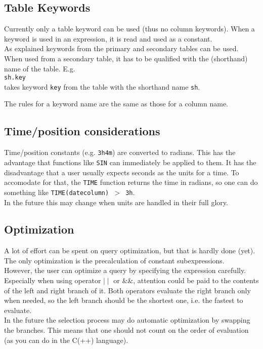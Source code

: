 \label{TAQL:KEYWORDS}
\subsection{Table Keywords}
Currently only a table keyword can be used (thus no column keywords).
When a keyword is used in an expression, it is read and used as
a constant.
\\
As explained 
keywords from the primary and secondary tables can be used. When used
from a secondary table, it has to be qualified with the (shorthand) name
of the table. E.g.
\\\texttt{sh.key}
\\takes keyword \texttt{key} from the table with the shorthand name
\texttt{sh}.

The rules for a keyword name are the same as those for a column name.

\subsection{Time/position considerations}
Time/position constants (e.g. \texttt{3h4m}) are converted to
radians. This has the advantage that functions like \texttt{SIN}
can immediately be applied to them. It has the disadvantage that
a user usually expects seconds as the units for a time. To accomodate
for that, the \texttt{TIME} function returns the time in radians,
so one can do something like \texttt{TIME(datecolumn) $>$ 3h}.
\\In the future this may change when units are handled in their full glory.

\subsection{Optimization}
A lot of effort can be spent on query optimization, but that is hardly
done (yet). The only optimization is the precalculation of constant
subexpressions.
\\
However, the user can optimize a query by specifying the expression
carefully. Especially when using operator $\mid\mid$ or \&\&, attention could be
paid to the contents of the left and right branch of it. Both operators
evaluate the right branch only when needed, so the left branch
should be the shortest one, i.e. the fastest to evaluate.
\\In the future the selection process may do automatic optimization
by swapping the branches. This means that one should not count on
the order of evaluation (as you can do in the C(++) language).

